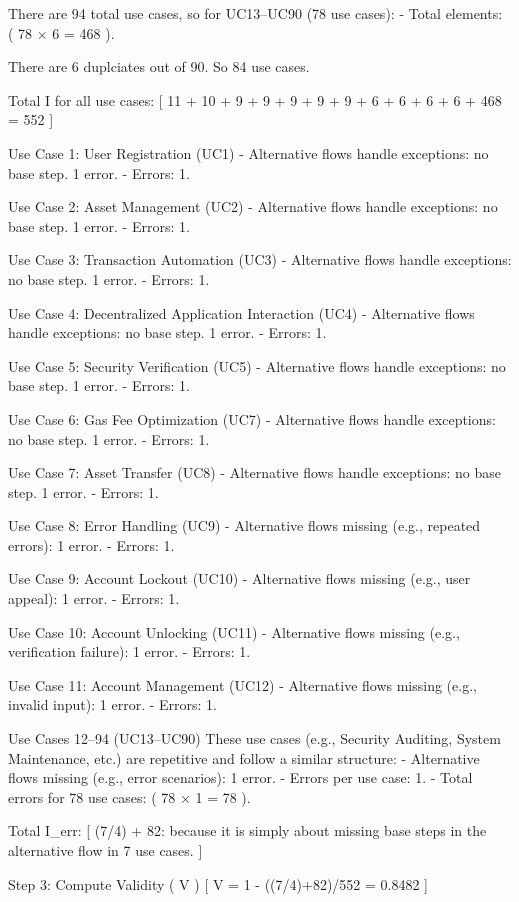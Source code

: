 There are 94 total use cases, so for UC13–UC90 (78 use cases):
- Total elements: ( 78 × 6 = 468 ).

There are 6 duplciates out of 90. So 84 use cases. 

Total I for all use cases:
[
11 + 10 + 9 + 9 + 9 + 9 + 9 + 6 + 6 + 6 + 6 + 468 = 552
]

Use Case 1: User Registration (UC1)
- Alternative flows handle exceptions: no base step. 1 error.
- Errors: 1.

Use Case 2: Asset Management (UC2)
- Alternative flows handle exceptions: no base step. 1 error.
- Errors: 1.

Use Case 3: Transaction Automation (UC3)
- Alternative flows handle exceptions: no base step. 1 error.
- Errors: 1.

Use Case 4: Decentralized Application Interaction (UC4)
- Alternative flows handle exceptions: no base step. 1 error.
- Errors: 1.

Use Case 5: Security Verification (UC5)
- Alternative flows handle exceptions: no base step. 1 error.
- Errors: 1.

Use Case 6: Gas Fee Optimization (UC7)
- Alternative flows handle exceptions: no base step. 1 error.
- Errors: 1.

Use Case 7: Asset Transfer (UC8)
- Alternative flows handle exceptions: no base step. 1 error.
- Errors: 1.

Use Case 8: Error Handling (UC9)
- Alternative flows missing (e.g., repeated errors): 1 error.
- Errors: 1.

Use Case 9: Account Lockout (UC10)
- Alternative flows missing (e.g., user appeal): 1 error.
- Errors: 1.

Use Case 10: Account Unlocking (UC11)
- Alternative flows missing (e.g., verification failure): 1 error.
- Errors: 1.

Use Case 11: Account Management (UC12)
- Alternative flows missing (e.g., invalid input): 1 error.
- Errors: 1.

Use Cases 12–94 (UC13–UC90)
These use cases (e.g., Security Auditing, System Maintenance, etc.) are repetitive and follow a similar structure:
- Alternative flows missing (e.g., error scenarios): 1 error.
- Errors per use case: 1.
- Total errors for 78 use cases: ( 78 × 1 = 78 ).

Total I_err:
[
(7/4) + 82: because it is simply about missing base steps in the alternative flow in 7 use cases. 
]

Step 3: Compute Validity ( V )
[
V = 1 - ((7/4)+82)/552 = 0.8482
]

